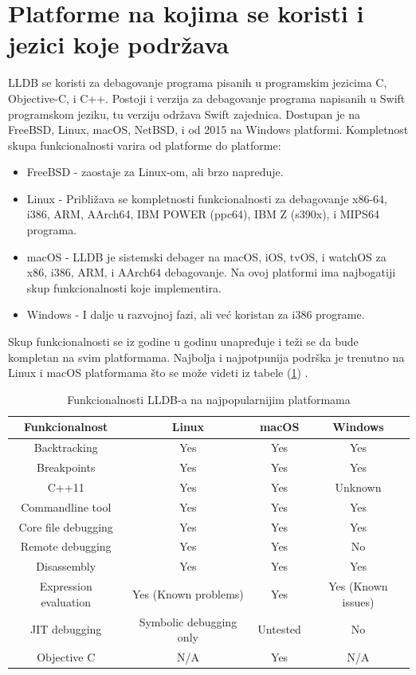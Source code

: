 \documentclass[a4paper]{article}
\begin{document}
\section{Platforme na kojima se koristi i jezici koje podržava }
\label{sec: Gde se on koristi i za koje jezike?}
LLDB se koristi za debagovanje programa pisanih u programskim jezicima C, Objective-C, i C++. Postoji i verzija za debagovanje programa napisanih u Swift programskom jeziku, tu verziju održava Swift zajednica. 
Dostupan je na FreeBSD, Linux, macOS, NetBSD, i od 2015 na Windows platformi. Kompletnost skupa funkcionalnosti varira od platforme do platforme\cite{lldb_status}:
\begin{itemize}
\item FreeBSD - zaostaje za Linux-om, ali brzo napreduje.
\item Linux - Približava se kompletnosti funkcionalnosti za debagovanje x86-64, i386, ARM, AArch64, IBM POWER (ppc64), IBM Z (s390x), i MIPS64 programa.
\item macOS - LLDB je sistemski debager na macOS, iOS, tvOS, i watchOS za x86, i386, ARM, i AArch64 debagovanje. Na ovoj platformi ima najbogatiji skup funkcionalnosti koje implementira.
\item Windows - I dalje u razvojnoj fazi, ali već koristan za i386 programe.
\end{itemize}
Skup funkcionalnosti se iz godine u godinu unapređuje i teži se da bude kompletan na svim platformama. Najbolja i najpotpunija podrška je trenutno na Linux i macOS platformama što se može videti iz tabele (\ref{tab:table lldb features}) \cite{lldb_status}.

\begin{table}[h!]
\center
\caption{Funkcionalnosti LLDB-a na najpopularnijim platformama}
\label{tab:table lldb features}
\begin{tabular}{|c|c c c|} 
 \hline
 Funkcionalnost & Linux & macOS & Windows \\ [0.5ex] 
 \hline
 Backtracking & Yes & Yes & Yes \\ 
 Breakpoints & Yes & Yes & Yes \\
 C++11 & Yes & Yes & Unknown \\
 Commandline tool & Yes & Yes & Yes \\
 Core file debugging  & Yes & Yes & Yes \\
  Remote debugging & Yes & Yes & No\\ [1ex] 
 Disassembly & Yes & Yes & Yes  \\
 Expression evaluation & Yes (Known problems)& Yes & Yes (Known issues) \\
 JIT debugging & Symbolic debugging only & Untested & No \\
 Objective C & N/A & Yes & N/A \\
 \hline
\end{tabular}
\end{table}
\end{document}

